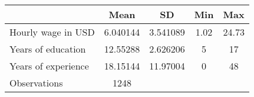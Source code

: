 {
\def\sym#1{\ifmmode^{#1}\else\(^{#1}\)\fi}
\begin{tabular}{l*{1}{cccc}}
\hline\hline
                    &        Mean&          SD&         Min&         Max\\
\hline
Hourly wage in USD  &    6.040144&    3.541089&        1.02&       24.73\\
Years of education  &    12.55288&    2.626206&           5&          17\\
Years of experience &    18.15144&    11.97004&           0&          48\\
\hline
Observations        &        1248&            &            &            \\
\hline\hline
\end{tabular}
}
